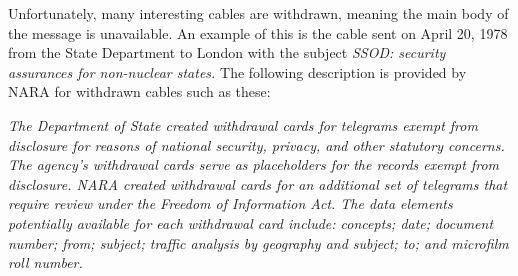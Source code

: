 Unfortunately, many interesting cables are withdrawn, meaning the main body of the message is unavailable.  An example of this is the cable sent on April 20, 1978 from the State Department to London with the subject \emph{SSOD: security assurances for non-nuclear states.}  The following description is provided by NARA for withdrawn cables such as these:
\begin{shaded*}
\emph{The Department of State created withdrawal cards for telegrams exempt from disclosure for reasons of national security, privacy, and other statutory concerns. The agency's withdrawal cards serve as placeholders for the records exempt from disclosure. NARA created withdrawal cards for an additional set of telegrams that require review under the Freedom of Information Act. The data elements potentially available for each withdrawal card include: concepts; date; document number; from; subject; traffic analysis by geography and subject; to; and microfilm roll number.}
\end{shaded*}

